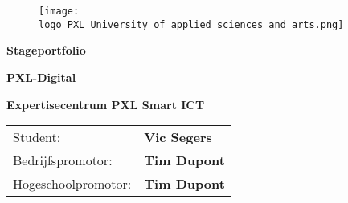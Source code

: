 \begin{titlepage}
  \begin{figure}
    \texttt{[image: logo\_PXL\_University\_of\_applied\_sciences\_and\_arts.png]}
  \end{figure}
  \vspace*{0.5cm}
  \begin{center}
    \Huge\textbf{\textcolor{pxlgreen}{Stageportfolio}}
  \end{center}
  \vspace{0.5cm}
  \begin{center}
    \LARGE\textbf{\textcolor{pxlgreen}{PXL-Digital}}
  \end{center}
  \vspace{2.5cm}
  \begin{center}
    \Large\textbf{Expertisecentrum PXL Smart ICT}
  \end{center}
  \vspace{3cm}
  \begin{tabularx}{\linewidth}{l l}
    Student: & \textbf{Vic Segers}\\
    Bedrijfspromotor: & \textbf{Tim Dupont}\\
    Hogeschoolpromotor: & \textbf{Tim Dupont}
  \end{tabularx}
  \vfill
\end{titlepage}